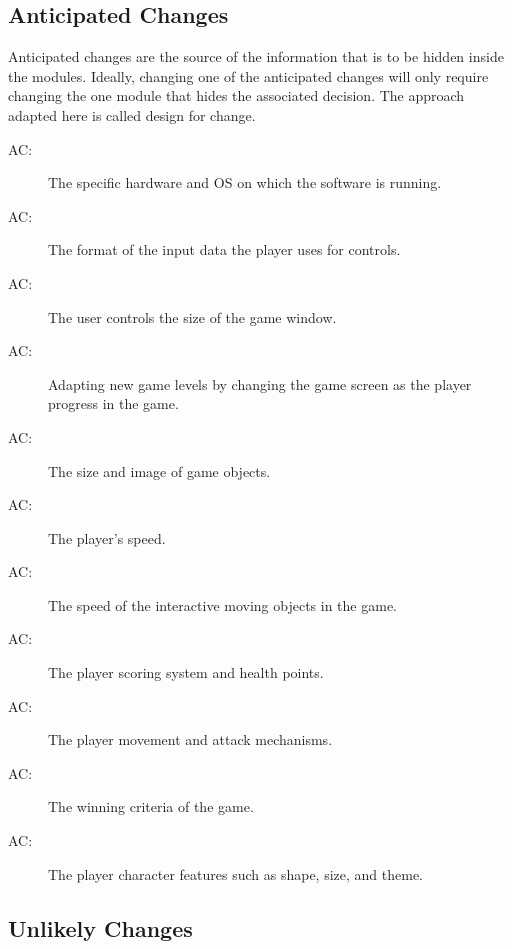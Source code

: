 \documentclass[12pt, titlepage]{article}
\newcounter{acnum}
\newcommand{\actheacnum}{AC\theacnum}
\begin{document}
\subsection{Anticipated Changes} \label{SecAchange}

Anticipated changes are the source of the information that is to be hidden
inside the modules. Ideally, changing one of the anticipated changes will only
require changing the one module that hides the associated decision. The approach
adapted here is called design for change.

\begin{description}
\item[ \actheacnum \label{acHardware}:] The specific
  hardware and OS on which the software is running.
\item[ \actheacnum \label{acInput}:] The format of the input data the player uses for controls.
\item [ \actheacnum \label{acWindow}:] The user controls the size of the game window. 
\item [ \actheacnum \label{acScreen}:] Adapting new game levels by changing the game screen as the player progress in the game.
\item [ \actheacnum \label{acObject}:] The size and image of game objects.
\item [ \actheacnum \label{acSpeed}:] The player's speed. 
\item [ \actheacnum \label{acSpeed2}:] The speed of the interactive moving objects in the game.
\item [ \actheacnum \label{acScore}:] The player scoring system and health points. 
\item [ \actheacnum \label{acAction}:] The player movement and attack mechanisms. 
\item [ \actheacnum \label{acWin}:] The winning criteria of the game. 
\item [ \actheacnum \label{acPlayer}:] The player character features such as shape, size, and theme. 
\end{description}

\subsection{Unlikely Changes} \label{SecUchange}
\end{document}
